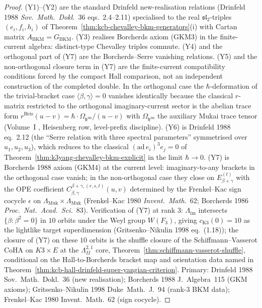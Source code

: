 \begin{proof}
(Y1)--(Y2) are the standard Drinfeld new-realisation relations
(Drinfeld 1988 \emph{Sov.~Math.~Dokl.}~36 eqs.~2.4--2.11) specialised
to the real $\mathfrak{sl}_2$-triples $(e_i,f_i,h_i)$ of
Theorem~\ref{thm:kcb-chevalley-bkm-generators}(i) with Cartan matrix
$A_{\mathrm{BKM}}=G_{\mathrm{BKM}}$. (Y3) realises Borcherds axiom
(GKM3) in the finite-current algebra: distinct-type Chevalley triples commute.
(Y4) and the orthogonal part of (Y7) are the Borcherds--Serre
vanishing relations. (Y5) and the non-orthogonal
closure term in (Y7) are the finite-current compatibility conditions
forced by the compact Hall comparison, not an independent construction
of the completed double. In the orthogonal case
the $\hbar$-deformation of the trivial-bracket case
$\langle\beta,\gamma\rangle=0$ vanishes identically because the
classical $r$-matrix restricted to the orthogonal imaginary-current
sector is the abelian trace form
$r^{\mathrm{Heis}}(u-v) = \hbar\cdot\Omega_{\mathfrak{h}^{\mathrm{im}}}/(u-v)$
with $\Omega_{\mathfrak{h}^{\mathrm{im}}}$ the auxiliary Mukai trace
tensor (Volume~I
\cite{VolI},
Heisenberg row, level-prefix discipline). (Y6) is Drinfeld 1988
eq.~2.12 (the ``Serre relation with three spectral parameters''
symmetrised over $u_1,u_2,u_3$), which reduces to the classical
$(\mathrm{ad}\,e_i)^3 e_j=0$ of
Theorem~\ref{thm:k3yang-chevalley-bkm-explicit} in the limit
$\hbar\to 0$. (Y7) is Borcherds 1988 axiom (GKM4) at the current
level: imaginary-to-any brackets in the orthogonal case vanish; in
the non-orthogonal case they close on $E_{\beta+\gamma}^{(t)}$ with
the OPE coefficient $C^{\beta+\gamma,(r,s,t)}_{\beta,\gamma}(u,v)$
determined by the Frenkel--Kac sign cocycle $\epsilon$ on
$\Lambda_{\mathrm{Muk}}\times\Lambda_{\mathrm{Muk}}$ (Frenkel--Kac
1980 \emph{Invent.~Math.}~62; Borcherds 1986 \emph{Proc.~Nat.~Acad.~Sci.}~83).
Verification of (Y7) at rank $3$: $\Lambda_{\mathrm{im}}$ intersects
$\{\beta:\beta^2=0\}$ in $10$ orbits under the Weyl group
$W(F_3)$, giving $c_{\mathrm{K3}}(0)=10$ as the lightlike target
superdimension (Gritsenko--Nikulin 1998 eq.~(1.18)); the closure of (Y7) on these
$10$ orbits is the shuffle closure of the
Schiffmann--Vasserot CoHA on $K3\times E$ at the $\Lambda^{2,1}_{II}$ core,
Theorem~\ref{thm:schiffmann-vasserot-shuffle}, conditional on the
Hall-to-Borcherds bracket map and orientation data named in
Theorem~\ref{thm:kcb-hall-drinfeld-super-yangian-criterion}. Primary:
Drinfeld 1988
\textup{Sov.~Math.~Dokl.}~36 (new realisation); Borcherds 1988
\textup{J.~Algebra}~115 (GKM axioms); Gritsenko--Nikulin 1998
\textup{Duke~Math.~J.}~94 (rank-$3$ BKM data); Frenkel--Kac 1980
\textup{Invent.~Math.}~62 (sign cocycle).
\end{proof}

